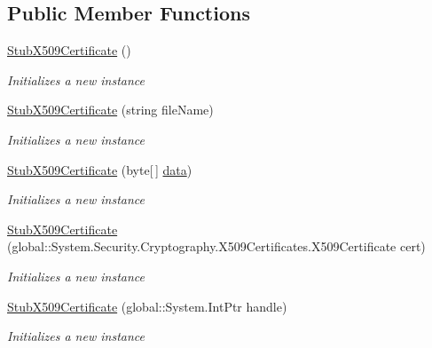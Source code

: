 \subsection*{Public Member Functions}
\begin{DoxyCompactItemize}
\item 
\hyperlink{class_system_1_1_security_1_1_cryptography_1_1_x509_certificates_1_1_fakes_1_1_stub_x509_certificate_aee8b1b7a67b7909af2f69bf5c7027674}{Stub\-X509\-Certificate} ()
\begin{DoxyCompactList}\small\item\em Initializes a new instance\end{DoxyCompactList}\item 
\hyperlink{class_system_1_1_security_1_1_cryptography_1_1_x509_certificates_1_1_fakes_1_1_stub_x509_certificate_a4df631287a786687835299e447d9806f}{Stub\-X509\-Certificate} (string file\-Name)
\begin{DoxyCompactList}\small\item\em Initializes a new instance\end{DoxyCompactList}\item 
\hyperlink{class_system_1_1_security_1_1_cryptography_1_1_x509_certificates_1_1_fakes_1_1_stub_x509_certificate_a586a26d222788422b263137c84c5e399}{Stub\-X509\-Certificate} (byte\mbox{[}$\,$\mbox{]} \hyperlink{jquery-1_810_82-vsdoc_8js_a609407b3456fdc3c5671a9fc4a226ff7}{data})
\begin{DoxyCompactList}\small\item\em Initializes a new instance\end{DoxyCompactList}\item 
\hyperlink{class_system_1_1_security_1_1_cryptography_1_1_x509_certificates_1_1_fakes_1_1_stub_x509_certificate_ad22229a351fba9a943fd80887d0b2e0e}{Stub\-X509\-Certificate} (global\-::\-System.\-Security.\-Cryptography.\-X509\-Certificates.\-X509\-Certificate cert)
\begin{DoxyCompactList}\small\item\em Initializes a new instance\end{DoxyCompactList}\item 
\hyperlink{class_system_1_1_security_1_1_cryptography_1_1_x509_certificates_1_1_fakes_1_1_stub_x509_certificate_a9698261c8a7eca75c2d4cd7da941377a}{Stub\-X509\-Certificate} (global\-::\-System.\-Int\-Ptr handle)
\begin{DoxyCompactList}\small\item\em Initializes a new instance\end{DoxyCompactList}\item 

\end{DoxyCompactItemize}
